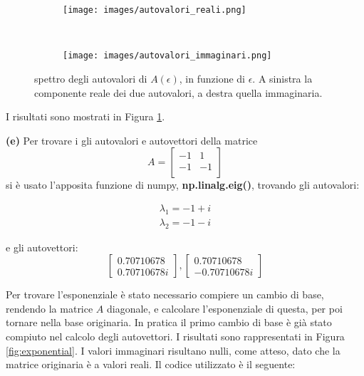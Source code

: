 \documentclass{article}
\begin{document}
\begin{figure}
     \centering
     \begin{subfigure}[b]{0.45\textwidth}
         \centering
         \texttt{[image: images/autovalori\_reali.png]}
     \end{subfigure}
     \,\,\,\,\,\,\,\,\,
     \begin{subfigure}[b]{0.45\textwidth}
         \centering
         \texttt{[image: images/autovalori\_immaginari.png]}
     \end{subfigure}
     \caption{spettro degli autovalori di $A(\epsilon)$, in funzione di $\epsilon$. A sinistra la componente reale dei due autovalori, a destra quella immaginaria.}
     \label{fig:eigenvalues_spectrum}
\end{figure}

I risultati sono mostrati in Figura \ref{fig:eigenvalues_spectrum}.

\textbf{(e)}
Per trovare i gli autovalori e autovettori della matrice \[
A = 
\begin{bmatrix}
    -1 & 1 \\
    -1  & -1 \\
\end{bmatrix}
\]
si è usato l'apposita funzione di numpy, \textbf{np.linalg.eig()}, 
trovando gli autovalori:

\[
\begin{matrix}
    \lambda_{1} = -1+i \\
    \lambda_{2} = -1-i 
\end{matrix}
\]

e gli autovettori:
\[
\begin{bmatrix}
    0.70710678 \\
    0.70710678i 
\end{bmatrix}
,
\begin{bmatrix}
    0.70710678 \\
    -0.70710678i
\end{bmatrix}
\]

Per trovare l'esponenziale è stato necessario compiere un cambio di base, rendendo la matrice $A$ diagonale, e calcolare l'esponenziale di questa, per poi tornare nella base originaria. In pratica il primo cambio di base è già stato compiuto nel calcolo degli autovettori. I risultati sono rappresentati in Figura \ref{fig:exponential}. I valori immaginari risultano nulli, come atteso, dato che la matrice originaria è a valori reali. Il codice utilizzato è il seguente:
\end{document}
